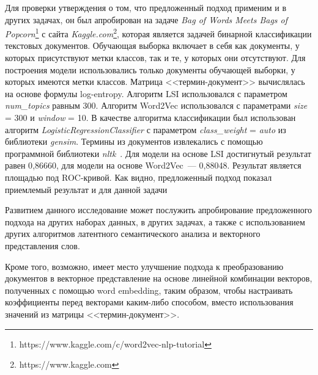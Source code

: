 Для проверки утверждения о том, что предложенный подход применим и в других
задачах, он был апробирован на задаче \textit{Bag of Words Meets Bags
of Popcorn}\footnote{https://www.kaggle.com/c/word2vec-nlp-tutorial}
с сайта \textit{Kaggle.com}\footnote{https://www.kaggle.com},
которая является задачей бинарной классификации текстовых документов.
Обучающая выборка включает в себя как документы, у которых
присутствуют метки классов, так и те, у которых они отсутствуют.
Для построения модели использовались только документы обучающей
выборки, у которых имеются метки классов. Матрица <<термин-документ>>
вычислялась на основе формулы log-entropy. Алгоритм LSI использовался
с параметром \textit{num\_topics} равным 300. Алгоритм Word2Vec
использовался с параметрами \textit{size} = 300 и \textit{window} =
10. В качестве алгоритма классификации был использован алгоритм
\textit{LogisticRegressionClassifier} с 
параметром \textit{class\_weight} = \textit{auto} из библиотеки \textit{gensim}.
Термины из документов извлекались с помощью программной библиотеки
\textit{nltk}~\cite{nltk}. Для модели на основе LSI достигнутый
результат равен 0{,}86660, для модели на основе Word2Vec~---
0{,}88048. Результат является площадью под
ROC-кривой. Как видно, предложенный подход показал
приемлемый результат и для данной задачи

Развитием данного исследование может послужить апробирование 
предложенного подхода на других наборах данных, в других задачах,
а также с использованием других алгоритмов латентного семантического
анализа и векторного представления слов.

Кроме того, возможно, имеет место улучшение подхода к преобразованию
документов в векторное представление на основе линейной комбинации
векторов, полученных с помощью word embedding, таким образом, чтобы
настраивать коэффициенты перед векторами каким-либо способом, вместо
использования значений из матрицы <<термин-документ>>.

